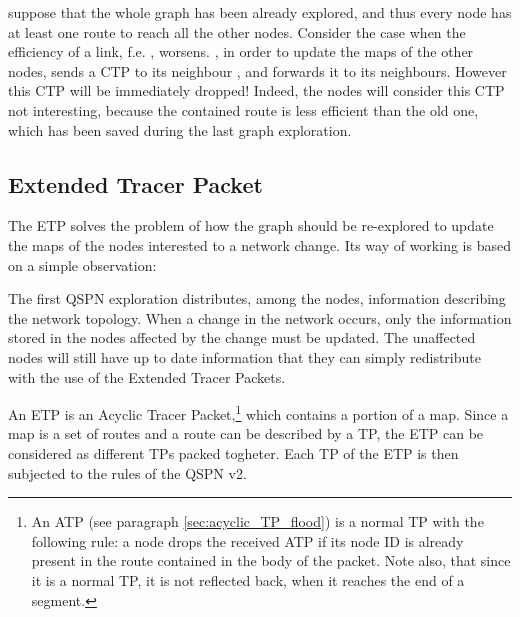 \documentclass[a4paper]{article}
\begin{document}
suppose that the whole graph has been already explored, and thus every node
has at least one route to reach all the other nodes. Consider the case when
the efficiency of a link, f.e. , worsens.
, in order to update the maps of the other nodes, sends a CTP to its
neighbour , and  forwards it to its neighbours. However this CTP will be
immediately dropped! Indeed, the nodes will consider this CTP not interesting,
because the contained  route is less
efficient than the old one, which has been saved during the last graph
exploration.

\subsection{Extended Tracer Packet}
\label{sec:etp}
The ETP solves the problem of how the graph should be re-explored to
update the maps of the nodes interested to a network change.
Its way of working is based on a simple observation:

The first QSPN exploration distributes, among the nodes, information describing
the network topology. 
When a change in the network occurs, only
the information stored in the nodes affected by the change must be updated.
The unaffected nodes will still have up to date information that they can simply
redistribute with the use of the Extended Tracer Packets.

An ETP is an Acyclic Tracer Packet,\footnote{
An ATP (see paragraph \ref{sec:acyclic_TP_flood}) is a normal TP with the following
rule: a node drops the received ATP if  its  node ID is already present in the route
contained in the body of the packet. Note also, that since it is a normal TP,
it is not reflected back, when it reaches the end of a segment.}
which contains a portion of a map. Since a map is a set of routes and a
route can be described by a TP, the ETP can be considered as different TPs packed togheter.
Each TP of the ETP is then subjected to the rules of the QSPN v2.
\end{document}

